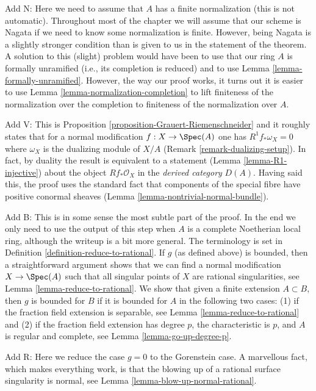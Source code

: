 \medskip\noindent
Add N: Here we need to assume that $A$ has a finite normalization
(this is not automatic). Throughout most of the chapter we will
assume that our scheme is Nagata if we need to know some normalization
is finite. However, being Nagata is a slightly stronger condition
than is given to us in the statement of the theorem.
A solution to this (slight) problem would have been to use that
our ring $A$ is formally unramified (i.e., its completion
is reduced) and to use Lemma \ref{lemma-formally-unramified}.
However, the way our proof works, it turns out it is easier to
use Lemma \ref{lemma-normalization-completion}
to lift finiteness of the normalization over the
completion to finiteness of the normalization over $A$.

\medskip\noindent
Add V: This is Proposition \ref{proposition-Grauert-Riemenschneider}
and it roughly states that for a normal modification $f : X \to \Spec(A)$
one has $R^1f_*\omega_X = 0$ where $\omega_X$ is the dualizing module
of $X/A$ (Remark \ref{remark-dualizing-setup}).
In fact, by duality the result is equivalent to a statement
(Lemma \ref{lemma-R1-injective})
about the object $Rf_*\mathcal{O}_X$ in the {\it derived category} $D(A)$.
Having said this, the proof uses the standard fact that
components of the special fibre have positive conormal
sheaves (Lemma \ref{lemma-nontrivial-normal-bundle}).

\medskip\noindent
Add B: This is in some sense the most subtle part of the proof.
In the end we only need to use the output of this step when $A$
is a complete Noetherian local ring, although the writeup is a
bit more general. The terminology is set in
Definition \ref{definition-reduce-to-rational}.
If $g$ (as defined above) is bounded, then a straightforward
argument shows that we can find a normal modification $X \to \Spec(A)$
such that all singular points of $X$ are rational singularities, see
Lemma \ref{lemma-reduce-to-rational}. We show that given a finite extension
$A \subset B$, then $g$ is bounded for $B$ if it is bounded for $A$
in the following two cases: (1) if the fraction field extension
is separable, see Lemma \ref{lemma-reduce-to-rational} and
(2) if the fraction field extension has degree $p$,
the characteristic is $p$, and $A$ is regular and complete, see
Lemma \ref{lemma-go-up-degree-p}.

\medskip\noindent
Add R: Here we reduce the case $g = 0$ to the Gorenstein case.
A marvellous fact, which makes everything work, is that the
blowing up of a rational surface singularity is normal, see
Lemma \ref{lemma-blow-up-normal-rational}.

